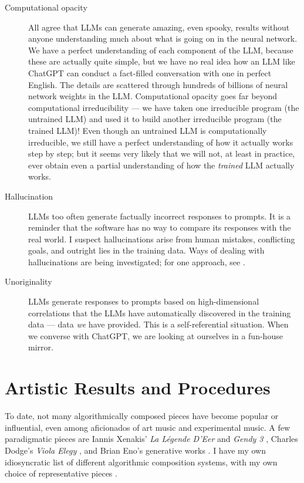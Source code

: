 \documentclass[]{interact}
\theoremstyle{plain}%
\theoremstyle{definition}
\theoremstyle{remark}
\begin{document}
\begin{description}
\item[Computational opacity] All agree that LLMs can generate amazing, even spooky, results without anyone understanding much about what is going on in the neural network. We have a perfect understanding of each component of the LLM, because these are actually quite simple, but we have no real idea how an LLM like ChatGPT can conduct a fact-filled conversation with one in perfect English. The details are scattered through hundreds of billions of neural network weights in the LLM. Computational opacity goes far beyond computational irreducibility --- we have taken one irreducible program (the untrained LLM) and used it to build another irreducible program (the trained LLM)! Even though an untrained LLM is computationally irreducible, we still have a perfect understanding of how it actually works step by step; but it seems very likely that we will not, at least in practice, ever obtain even a partial understanding of how the \emph{trained} LLM actually works.
\item [Hallucination] LLMs too often generate factually incorrect responses to prompts. It is a reminder that the software has no way to compare its responses with the real world. I suspect hallucinations arise from human mistakes, conflicting goals, and outright lies in the training data. Ways of dealing with hallucinations are being investigated; for one approach, see \citep{christiano2017deep}.
\item [Unoriginality] LLMs generate responses to prompts based on high-dimensional correlations that the LLMs have automatically discovered in the training data --- data \emph{we} have provided. This is a self-referential situation. When we converse with ChatGPT, we are looking at ourselves in a fun-house mirror.
\end{description}

\section{Artistic Results and Procedures}

To date, not many algorithmically composed pieces have become popular or influential, even among aficionados of art music and experimental music. A few paradigmatic pieces are Iannis Xenakis' \emph{La Légende D'Eer} \citep{Solr-8143160} and \emph{Gendy 3} \citep{gendy3},  Charles Dodge's \emph{Viola Elegy} \citep{violaelegy}, and Brian Eno's generative works \citep{eno1996generative, enochilvers}. I have my own idiosyncratic list of different algorithmic composition systems, with my own choice of representative pieces \citep{rant}.
\end{document}
